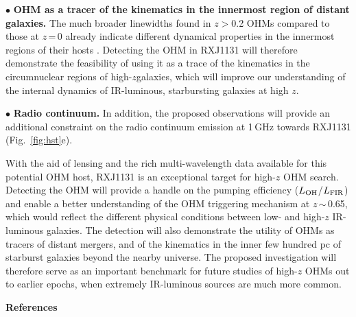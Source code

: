 \documentclass[letterpaper,11pt]{article}
\newcommand{\LFIR}{\mbox{$L_{\rm FIR}$}\xspace}
\newcommand{\LOH}{$L_{\rm OH}$\xspace}
\newcommand{\Fig}[1]{Fig.~\ref{fig:#1}}
\newcommand{\eq}{\,=\,}
\newcommand{\ssim}{\,$\sim$\,}
\newcommand{\highz}{high-$z$\space}
\newcommand{\obs}{observations\xspace}
\begin{document}
\noindent $\bullet$ {\bf OHM as a tracer of the kinematics in the innermost region of distant galaxies.}
The much broader linewidths found in $z$$>$0.2 OHMs compared to those at $z$\eq0 already indicate
different dynamical properties in the innermost regions of their hosts \citep{Baan92a,Darling02a}.
Detecting the OHM in RXJ1131 will therefore demonstrate the feasibility of
using it as a trace of the kinematics in the circumnuclear regions of \highz galaxies, which will improve
our understanding of the internal dynamics of IR-luminous, starbursting galaxies at high $z$.

\noindent $\bullet$ {\bf Radio continuum.}
In addition, the proposed \obs will provide an additional constraint on the radio continuum emission at 1\,GHz
towards RXJ1131 (\Fig{hst}e).

\noindent
With the aid of lensing and the rich multi-wavelength data available for this potential OHM host, RXJ1131 is an exceptional target
for high-$z$ OHM search.
Detecting the OHM will provide a handle on the pumping efficiency (\LOH/\LFIR)
and enable a better understanding of the OHM triggering mechanism at $z$\ssim0.65, which
would reflect the different physical conditions between low- and high-$z$ IR-luminous galaxies.
The detection will also demonstrate the utility of OHMs as tracers of distant mergers, and
of the kinematics in the inner few hundred pc
of starburst galaxies beyond the nearby universe. %
The proposed investigation will therefore serve as an
important benchmark for future studies of high-$z$ OHMs out to earlier epochs,
when extremely IR-luminous sources are much more common.



\noindent \textbf{References}
{\fontsize{10pt}{12pt}\selectfont
    
}
\end{document}
